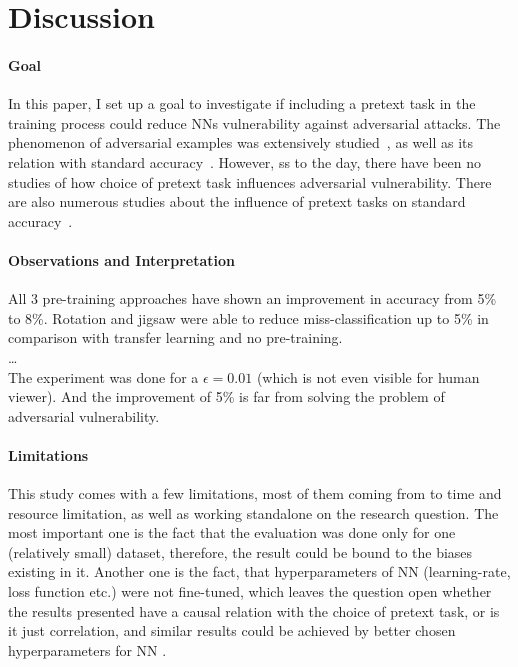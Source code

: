 \section{Discussion}

\paragraph{Goal}In this paper, I set up a goal to investigate if including a pretext task in the training process could reduce NNs
vulnerability against adversarial attacks.
The phenomenon of adversarial examples was extensively studied~\cite{ilyas2019adversarial, DBLP:journals/corr/abs-1802-08195, goodfellow2015explaining},
as well as its relation with standard accuracy~\cite{https://doi.org/10.48550/arxiv.1805.12152}.
However, ss to the day, there have been no studies of how choice of pretext task influences adversarial vulnerability.
There are also numerous studies about the influence of pretext tasks on standard
accuracy~\cite{DBLP:journals/corr/abs-1912-01991, DBLP:journals/corr/NorooziF16, kolesnikov2019revisiting}.


\paragraph{Observations and Interpretation}
All 3 pre-training approaches have shown an improvement in accuracy from 5\% to 8\%.
Rotation and jigsaw were able to reduce miss-classification up to 5\% in comparison with transfer learning and no pre-training.
\\
\ldots
\\
The experiment was done for a $\epsilon = 0.01$ (which is not even visible for human viewer).
And the improvement of 5\% is far from solving the problem of adversarial vulnerability.

\paragraph{Limitations}This study comes with a few limitations,
most of them coming from to time and resource limitation, as well as working standalone on the research question.
The most important one is the fact that the evaluation was done only for one (relatively small) dataset,
therefore, the result could be bound to the biases existing in it.
Another one is the fact, that hyperparameters of NN (learning-rate, loss function etc.)
were not fine-tuned, which leaves the question open whether the
results presented have a causal relation with the choice of pretext task, or is it just correlation,
and similar results could be achieved by better chosen hyperparameters for NN .

